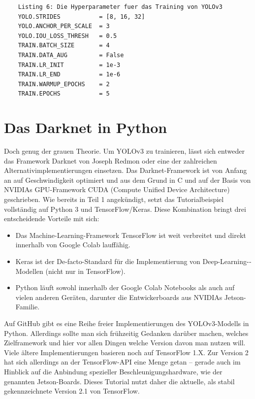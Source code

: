 \begin{lstlisting}
    Listing 6: Die Hyperparameter fuer das Training von YOLOv3 
	YOLO.STRIDES           = [8, 16, 32]
	YOLO.ANCHOR_PER_SCALE  = 3
	YOLO.IOU_LOSS_THRESH   = 0.5
	TRAIN.BATCH_SIZE       = 4
	TRAIN.DATA_AUG         = False
	TRAIN.LR_INIT          = 1e-3
	TRAIN.LR_END           = 1e-6
	TRAIN.WARMUP_EPOCHS    = 2
	TRAIN.EPOCHS           = 5
\end{lstlisting}	

\section{Das Darknet in Python}

	Doch genug der grauen Theorie. Um ­YOLOv3 zu trainieren, lässt sich entweder das Framework Darknet von Joseph Redmon oder eine der zahlreichen Alternativimplementierungen einsetzen. Das Darknet-Framework ist von Anfang an auf Geschwindigkeit optimiert und aus dem Grund in C und auf der Basis von ­NVIDIAs GPU-Framework CUDA (Compute Unified Device Architecture) geschrieben. 
	Wie bereits in Teil 1 angekündigt, setzt das Tutorialbeispiel vollständig auf Python 3 und TensorFlow/Keras. Diese Kombination bringt drei entscheidende Vorteile mit sich: 

\begin{itemize}
	\item Das Machine-Learning-Framework TensorFlow ist weit verbreitet und direkt innerhalb von Google Colab lauffähig. 
	\item Keras ist der De-facto-Standard für die Implementierung von Deep-Learning-­Modellen (nicht nur in TensorFlow). 
	\item Python läuft sowohl innerhalb der Goo­gle Colab Notebooks als auch auf vielen anderen Geräten, darunter die Entwickerboards aus NVIDIAs Jetson-Familie. 
\end{itemize}	


Auf GitHub gibt es eine Reihe freier Implementierungen des YOLOv3-Modells in Python. Allerdings sollte man sich frühzeitig Gedanken darüber machen, welches Zielframework und hier vor allen Dingen welche Version davon man nutzen will. Viele ältere Implementierungen basieren noch auf TensorFlow 1.X. Zur Version 2 hat sich allerdings an der TensorFlow-API eine Menge getan – gerade auch im Hinblick auf die Anbindung spezieller Beschleunigungshardware, wie der genannten Jetson-Boards. Dieses Tutorial nutzt daher die aktuelle, als stabil gekennzeichnete Version 2.1 von TensorFlow. 

